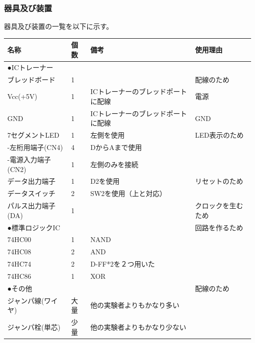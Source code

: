 \documentclass{scrartcl}
\begin{document}
\subsubsection{器具及び装置}
\label{sec:org0cf3476}
器具及び装置の一覧を以下に示す。\\
\begin{center}
\begin{tabular}{|l|l|l|l|}
\hline
名称 & 個数 & 備考 & 使用理由\\
\hline
●ICトレーナー &  &  & \\
ブレッドボード & 1 &  & 配線のため\\
Vcc(+5V) & 1 & ICトレーナーのブレッドポートに配線 & 電源\\
GND & 1 & ICトレーナーのブレッドポートに配線 & GND\\
7セグメントLED & 1 & 左側を使用 & LED表示のため\\
-左桁用端子(CN4) & 4 & DからAまで使用 & \\
-電源入力端子(CN2) & 1 & 左側のみを接続 & \\
データ出力端子 & 1 & D2を使用 & リセットのため\\
データスイッチ & 2 & SW2を使用（上と対応） & \\
パルス出力端子(DA) & 1 &  & クロックを生むため\\
\hline
●標準ロジックIC &  &  & 回路を作るため\\
74HC00 & 1 & NAND & \\
74HC08 & 2 & AND & \\
74HC74 & 2 & D-FF*2を２つ用いた & \\
74HC86 & 1 & XOR & \\
\hline
●その他 &  &  & 配線のため\\
ジャンパ線(ワイヤ) & 大量 & 他の実験者よりもかなり多い & \\
ジャンパ栓(単芯) & 少量 & 他の実験者よりもかなり少ない & \\
\hline
\end{tabular}
\end{center}
\end{document}
